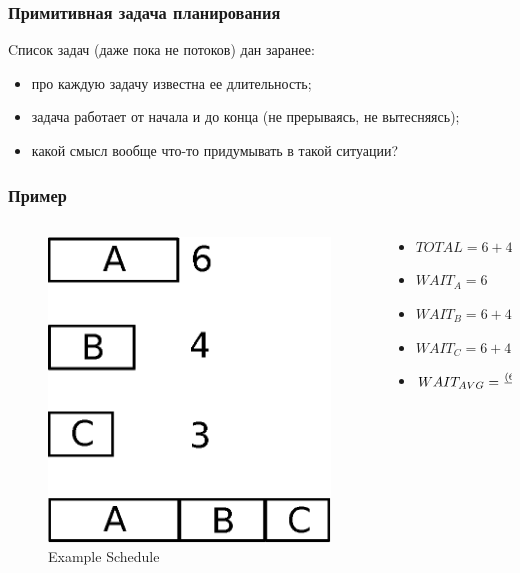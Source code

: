 \begin{frame}
\frametitle{Примитивная задача планирования}

Cписок задач (даже пока не потоков) дан заранее:
\begin{itemize}
  \item<2-> про каждую задачу известна ее длительность;
  \item<3-> задача работает от начала и до конца (не прерываясь, не вытесняясь);
  \item<4-> какой смысл вообще что-то придумывать в такой ситуации?
\end{itemize}
\end{frame}

\begin{frame}
\frametitle{Пример}

\begin{columns}[T]
  \begin{column}{.4\textwidth}
    \begin{figure}
      \centering\includegraphics[width=.9\linewidth]{sched0}
      \caption{Example Schedule}
    \end{figure}
  \end{column}
  \begin{column}{.6\textwidth}
    \begin{itemize}
      \item<2-> $TOTAL = 6 + 4 + 3 = 13$
      \item<3-> $WAIT_A = 6$
      \item<3-> $WAIT_B = 6 + 4 = 10$
      \item<3-> $WAIT_C = 6 + 4 + 3 = 13$
      \item<4-> $WAIT_{AVG} = {\left(6 + 10 + 13\right)\over 3} = 9.\left(6\right)$
    \end{itemize}
  \end{column}
\end{columns}
\end{frame}

